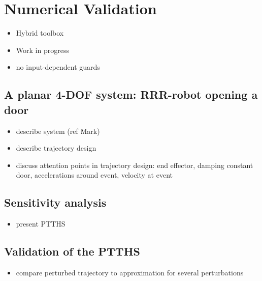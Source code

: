 \documentclass[../DC2017114Bouma.tex]{subfiles}
\begin{document}
\graphicspath{{04_Validation/img/}}
\renewcommand{\chaptermark}[1]{\markboth{\thechapter.\ #1}{}}
\renewcommand{\sectionmark}[1]{\markright{#1}{}}
\pagestyle{fancyreport}
\cleartooddpage
\pagestyle{fancyreport}
\chapter{Numerical Validation}\label{ch:vali}
\begin{itemize}
\item Hybrid toolbox
\item Work in progress
\item no input-dependent guards
\end{itemize}
\section{A planar 4-DOF system: RRR-robot opening a door}
\begin{itemize}
\item describe system (ref Mark)
\item describe trajectory design
\item discuss attention points in trajectory design: end effector, damping constant door, accelerations around event, velocity at event
\end{itemize}
\section{Sensitivity analysis}
\begin{itemize}
\item present PTTHS
\end{itemize}
\section{Validation of the PTTHS}
\begin{itemize}
\item compare perturbed trajectory to approximation for several perturbations
\end{itemize}
\end{document}
